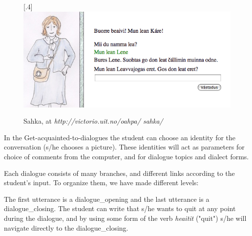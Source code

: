 \documentclass[11pt]{article}
\begin{document}
\begin{figure}[htbp]
\begin{center}
\scalebox{.4}[.4]{\includegraphics{presentation/img/sahka2.png}}\\
\caption{Sahka, at \textit{http://victorio.uit.no/oahpa/ sahka/}}
\label{sahka}
\end{center}
\end{figure}

In the Get-acquainted-to-dialogues the student can choose an identity for the conversation (s/he chooses a picture). These identities will act as parameters for choice of comments from the computer, and for dialogue topics and dialect forms.

%	


Each dialogue consists of many branches, and different links according to the student's input. To organize them, we have made different levels:

The first utterance is a dialogue\_opening and the last utterance is a dialogue\_closing. The student can write that s/he wants to quit at any point during the dialogue, and by using some form of the verb \textit{heaitit} ("quit") s/he will navigate directly to the dialogue\_closing.
\end{document}

